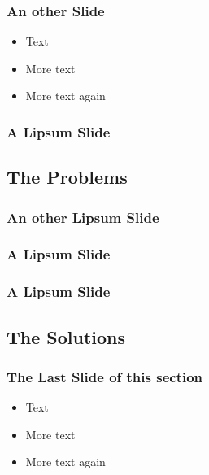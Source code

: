 \documentclass{beamer}
\begin{document}
\begin{frame} 
\frametitle{An other Slide}
  \begin{itemize}
  \item Text
  \item More text
  \item More text again
  \end{itemize}
\end{frame}


\begin{frame}
\frametitle{A Lipsum Slide}
  \lipsum[2]
\end{frame}

\subsection{The Problems}

\begin{frame}
\frametitle{An other Lipsum Slide}
  \lipsum[2]
\end{frame}


\begin{frame}
\frametitle{A Lipsum Slide}
  \lipsum[5]
\end{frame}


\begin{frame}
\frametitle{A Lipsum Slide}
  \lipsum[4]
\end{frame}

\subsection{The Solutions}

\begin{frame} 
\frametitle{The Last Slide of this section}
  \begin{itemize}
  \item Text
  \item More text
  \item More text again
  \end{itemize}
\end{frame}
\end{document}
